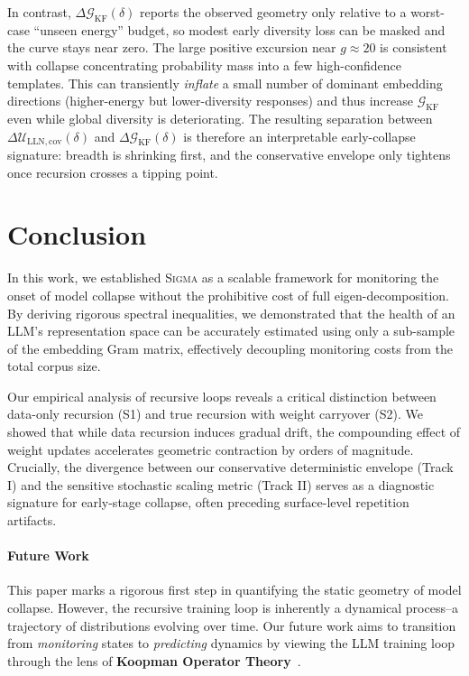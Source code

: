 \documentclass{article}
\theoremstyle{plain}
\theoremstyle{definition}
\theoremstyle{remark}
\newcommand{\sgma}{\textsc{Sigma}\xspace}
\begin{document}
\noindent In contrast, $\Delta\mathcal{G}_{\mathrm{KF}}(\delta)$ reports the observed geometry only relative to a worst-case ``unseen energy'' budget, so modest early diversity loss can be masked and the curve stays near zero. The large positive excursion near $g\!\approx\!20$ is consistent with collapse concentrating probability mass into a few high-confidence templates. This can transiently \emph{inflate} a small number of dominant embedding directions (higher-energy but lower-diversity responses) and thus increase $\mathcal{G}_{\mathrm{KF}}$ even while global diversity is deteriorating. The resulting separation between $\Delta\mathcal{U}_{\mathrm{LLN,cov}}(\delta)$ and $\Delta\mathcal{G}_{\mathrm{KF}}(\delta)$ is therefore an interpretable early-collapse signature: breadth is shrinking first, and the conservative envelope only tightens once recursion crosses a tipping point.
\section{Conclusion} \label{sec:conclusion}

In this work, we established \sgma as a scalable framework for monitoring the onset of model collapse without the prohibitive cost of full eigen-decomposition. By deriving rigorous spectral inequalities, we demonstrated that the health of an LLM’s representation space can be accurately estimated using only a sub-sample of the embedding Gram matrix, effectively decoupling monitoring costs from the total corpus size.

Our empirical analysis of recursive loops reveals a critical distinction between data-only recursion (S1) and true recursion with weight carryover (S2). We showed that while data recursion induces gradual drift, the compounding effect of weight updates accelerates geometric contraction by orders of magnitude. Crucially, the divergence between our conservative deterministic envelope (Track I) and the sensitive stochastic scaling metric (Track II) serves as a diagnostic signature for early-stage collapse, often preceding surface-level repetition artifacts.

\paragraph{Future Work} 
This paper marks a rigorous first step in quantifying the static geometry of model collapse. However, the recursive training loop is inherently a dynamical process--a trajectory of distributions evolving over time. Our future work aims to transition from \textit{monitoring} states to \textit{predicting} dynamics by viewing the LLM training loop through the lens of \textbf{Koopman Operator Theory}~\cite{brunton2021modernkoopmantheorydynamical}. 
\end{document}
